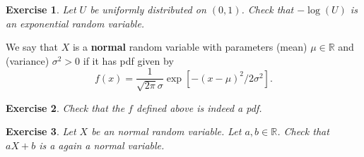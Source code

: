 \documentclass[12pt, reqno]{amsart}
\newtheorem{ex}{Exercise}[section]
\newcommand\dff[1]{\textbf{#1}}
\newcommand{\R}{{\mathbb R}}
\begin{document}
\begin{ex}  Let $U$ be uniformly distributed on $(0,1)$.  Check that $-\log(U)$ is an exponential random variable.

\end{ex}


We say that $X$ is a \dff{normal} random variable with parameters (mean) $\mu \in \R$ and (variance) $\sigma^2 >0$ if it has pdf given by
$$f(x) = \frac{1}{\sqrt{ 2\pi} \sigma } \exp[  -(x- \mu)^2 / 2 \sigma^2] .$$

\begin{ex}  Check that the $f$ defined above is indeed a pdf.

\end{ex}

\begin{ex}  Let $X$ be an normal  random variable.   Let $a,b \in \R$.  Check that $aX + b$ is a again a normal variable.  

\end{ex}
\end{document}
